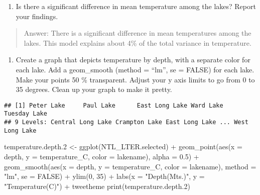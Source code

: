 \documentclass[
]{article}
\newenvironment{Shaded}{\begin{snugshade}}{\end{snugshade}}
\newcommand{\AttributeTok}[1]{\textcolor[rgb]{0.77,0.63,0.00}{#1}}
\newcommand{\CommentTok}[1]{\textcolor[rgb]{0.56,0.35,0.01}{\textit{#1}}}
\newcommand{\ConstantTok}[1]{\textcolor[rgb]{0.00,0.00,0.00}{#1}}
\newcommand{\DecValTok}[1]{\textcolor[rgb]{0.00,0.00,0.81}{#1}}
\newcommand{\FloatTok}[1]{\textcolor[rgb]{0.00,0.00,0.81}{#1}}
\newcommand{\FunctionTok}[1]{\textcolor[rgb]{0.00,0.00,0.00}{#1}}
\newcommand{\NormalTok}[1]{#1}
\newcommand{\OtherTok}[1]{\textcolor[rgb]{0.56,0.35,0.01}{#1}}
\newcommand{\SpecialCharTok}[1]{\textcolor[rgb]{0.00,0.00,0.00}{#1}}
\newcommand{\StringTok}[1]{\textcolor[rgb]{0.31,0.60,0.02}{#1}}
\providecommand{\tightlist}{%
  \setlength{\itemsep}{0pt}\setlength{\parskip}{0pt}}
\begin{document}
\begin{enumerate}
\def\labelenumi{\arabic{enumi}.}
\setcounter{enumi}{12}
\tightlist
\item
  Is there a significant difference in mean temperature among the lakes?
  Report your findings.
\end{enumerate}

\begin{quote}
Answer: There is a significant difference in mean temperatures among the
lakes. This model explains about 4\% of the total variance in
temperature.
\end{quote}

\begin{enumerate}
\def\labelenumi{\arabic{enumi}.}
\setcounter{enumi}{13}
\tightlist
\item
  Create a graph that depicts temperature by depth, with a separate
  color for each lake. Add a geom\_smooth (method = ``lm'', se = FALSE)
  for each lake. Make your points 50 \% transparent. Adjust your y axis
  limits to go from 0 to 35 degrees. Clean up your graph to make it
  pretty.
\end{enumerate}

\begin{Shaded}
\end{Shaded}

\begin{verbatim}
## [1] Peter Lake     Paul Lake      East Long Lake Ward Lake      Tuesday Lake  
## 9 Levels: Central Long Lake Crampton Lake East Long Lake ... West Long Lake
\end{verbatim}

\begin{Shaded}
\begin{Highlighting}[]
\NormalTok{temperature.depth}\FloatTok{.2} \OtherTok{\textless{}{-}} 
  \FunctionTok{ggplot}\NormalTok{(NTL\_LTER.selected) }\SpecialCharTok{+} 
  \FunctionTok{geom\_point}\NormalTok{(}\FunctionTok{aes}\NormalTok{(}\AttributeTok{x =}\NormalTok{ depth, }\AttributeTok{y =}\NormalTok{ temperature\_C, }\AttributeTok{color =}\NormalTok{ lakename), }\AttributeTok{alpha =} \FloatTok{0.5}\NormalTok{) }\SpecialCharTok{+}
  \FunctionTok{geom\_smooth}\NormalTok{(}\FunctionTok{aes}\NormalTok{(}\AttributeTok{x =}\NormalTok{ depth, }\AttributeTok{y =}\NormalTok{ temperature\_C, }\AttributeTok{color =}\NormalTok{ lakename), }\AttributeTok{method =} \StringTok{"lm"}\NormalTok{, }\AttributeTok{se =} \ConstantTok{FALSE}\NormalTok{) }\SpecialCharTok{+}
  \FunctionTok{ylim}\NormalTok{(}\DecValTok{0}\NormalTok{, }\DecValTok{35}\NormalTok{) }\SpecialCharTok{+} 
  \FunctionTok{labs}\NormalTok{(}\AttributeTok{x =} \StringTok{"Depth(Mts.)"}\NormalTok{, }\AttributeTok{y =} \StringTok{"Temperature(C)"}\NormalTok{) }\SpecialCharTok{+} 
\NormalTok{  tweetheme}
\FunctionTok{print}\NormalTok{(temperature.depth}\FloatTok{.2}\NormalTok{)}
\end{Highlighting}
\end{Shaded}
\end{document}
